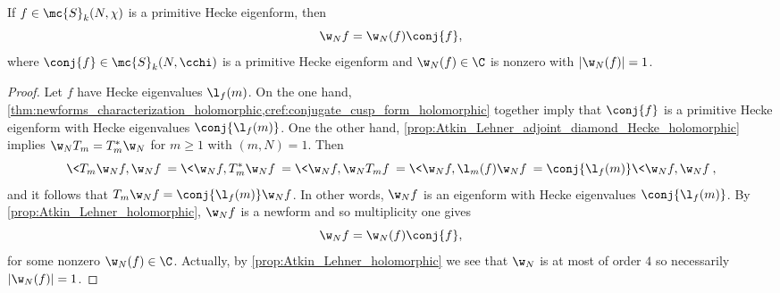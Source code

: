     \begin{proposition}\label{prop:Atkin_Lehner_conjugation_holomorphic}
      If $f \in \mc{S}_{k}(N,\chi)$ is a primitive Hecke eigenform, then
      \[
        \w_{N}f = \w_{N}(f)\conj{f},
      \]
      where $\conj{f} \in \mc{S}_{k}(N,\cchi)$ is a primitive Hecke eigenform and $\w_{N}(f) \in \C$ is nonzero with $|\w_{N}(f)| = 1$.
    \end{proposition}
    \begin{proof}
      Let $f$ have Hecke eigenvalues $\l_{f}(m)$. On the one hand, \cref{thm:newforms_characterization_holomorphic,cref:conjugate_cusp_form_holomorphic} together imply that $\conj{f}$ is a primitive Hecke eigenform with Hecke eigenvalues $\conj{\l_{f}(m)}$. One the other hand, \cref{prop:Atkin_Lehner_adjoint_diamond_Hecke_holomorphic} implies $\w_{N}T_{m} = T_{m}^{\ast}\w_{N}$ for $m \ge 1$ with $(m,N) = 1$. Then
      \[
        \<T_{m}\w_{N}f,\w_{N}f\> = \<\w_{N}f,T_{m}^{\ast}\w_{N}f\> = \<\w_{N}f,\w_{N}T_{m}f\> = \<\w_{N}f,\l_{m}(f)\w_{N}f\> = \conj{\l_{f}(m)}\<\w_{N}f,\w_{N}f\>,
      \]
      and it follows that $T_{m}\w_{N}f = \conj{\l_{f}(m)}\w_{N}f$. In other words, $\w_{N}f$ is an eigenform with Hecke eigenvalues $\conj{\l_{f}(m)}$. By \cref{prop:Atkin_Lehner_holomorphic}, $\w_{N}f$ is a newform and so multiplicity one gives
      \[
        \w_{N}f = \w_{N}(f)\conj{f},
      \]
      for some nonzero $\w_{N}(f) \in \C$. Actually, by \cref{prop:Atkin_Lehner_holomorphic} we see that $\w_{N}$ is at most of order $4$ so necessarily $|\w_{N}(f)| = 1$.
    \end{proof} 
